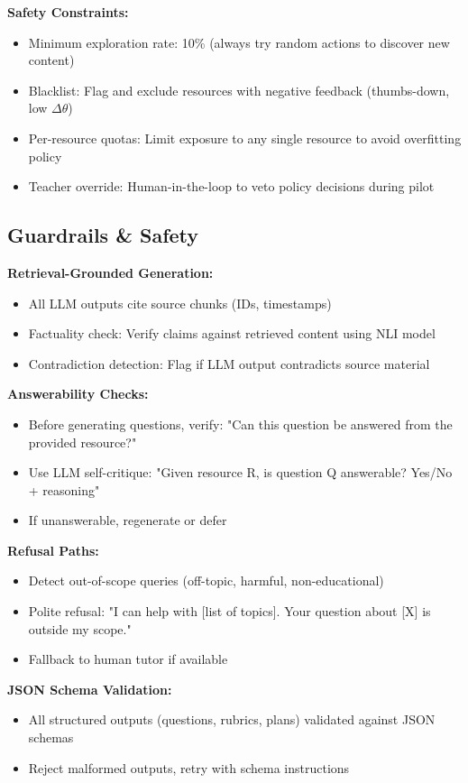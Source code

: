 \documentclass[11pt,letterpaper]{article}
\begin{document}
\textbf{Safety Constraints:}
\begin{itemize}
\item Minimum exploration rate: 10\% (always try random actions to discover new content)
\item Blacklist: Flag and exclude resources with negative feedback (thumbs-down, low $\Delta\theta$)
\item Per-resource quotas: Limit exposure to any single resource to avoid overfitting policy
\item Teacher override: Human-in-the-loop to veto policy decisions during pilot
\end{itemize}

\subsection{Guardrails \& Safety}

\textbf{Retrieval-Grounded Generation:}
\begin{itemize}
\item All LLM outputs cite source chunks (IDs, timestamps)
\item Factuality check: Verify claims against retrieved content using NLI model
\item Contradiction detection: Flag if LLM output contradicts source material
\end{itemize}

\textbf{Answerability Checks:}
\begin{itemize}
\item Before generating questions, verify: "Can this question be answered from the provided resource?"
\item Use LLM self-critique: "Given resource R, is question Q answerable? Yes/No + reasoning"
\item If unanswerable, regenerate or defer
\end{itemize}

\textbf{Refusal Paths:}
\begin{itemize}
\item Detect out-of-scope queries (off-topic, harmful, non-educational)
\item Polite refusal: "I can help with [list of topics]. Your question about [X] is outside my scope."
\item Fallback to human tutor if available
\end{itemize}

\textbf{JSON Schema Validation:}
\begin{itemize}
\item All structured outputs (questions, rubrics, plans) validated against JSON schemas
\item Reject malformed outputs, retry with schema instructions
\end{itemize}
\end{document}
